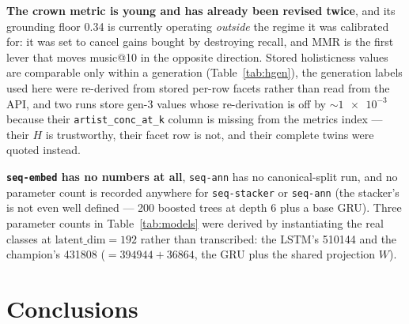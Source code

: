 \documentclass[11pt]{article}
\begin{document}
\textbf{The crown metric is young and has already been revised twice}, and its
grounding floor \num{0.34} is currently operating \emph{outside} the regime it
was calibrated for: it was set to cancel gains bought by destroying recall, and
MMR is the first lever that moves music@10 in the opposite direction. Stored
holisticness values are comparable only within a generation
(Table~\ref{tab:hgen}), the generation labels used here were re-derived from
stored per-row facets rather than read from the API, and two runs store gen-3
values whose re-derivation is off by ${\sim}\num{1e-3}$ because their
\texttt{artist\_conc\_at\_k} column is missing from the metrics index --- their
$H$ is trustworthy, their facet row is not, and their complete twins were quoted
instead.

\textbf{\texttt{seq-embed} has no numbers at all}, \texttt{seq-ann} has no
canonical-split run, and no parameter count is recorded anywhere for
\texttt{seq-stacker} or \texttt{seq-ann} (the stacker's is not even well defined
--- \num{200} boosted trees at depth 6 plus a base GRU). Three parameter counts
in Table~\ref{tab:models} were derived by instantiating the real classes at
$\text{latent\_dim}=192$ rather than transcribed: the LSTM's \num{510144} and the
champion's \num{431808} ($=\num{394944}+\num{36864}$, the GRU plus the shared
projection $W$).

\clearpage
\section{Conclusions}
\label{sec:conclusions}
\end{document}
